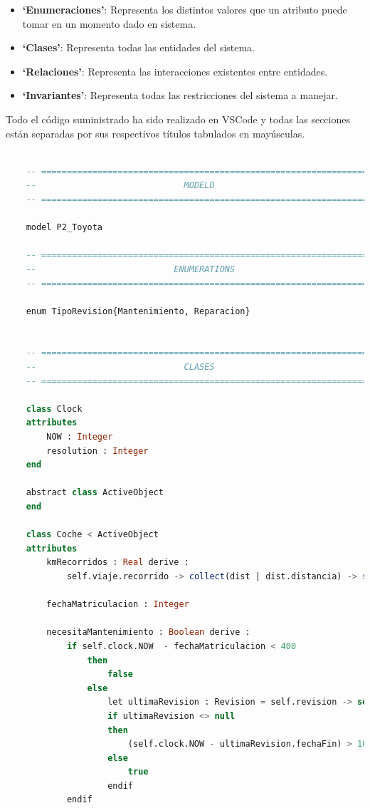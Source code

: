 \documentclass[12pt.a4paper]{article}
\begin{document}
\begin{itemize}
    \item \textbf{‘Enumeraciones’}: Representa los distintos valores que un atributo puede tomar en un momento dado en sistema.
    \item \textbf{‘Clases’}: Representa todas las entidades del sistema.
    \item \textbf{‘Relaciones’}: Representa las interacciones existentes entre entidades.
    \item \textbf{‘Invariantes’}: Representa todas las restricciones del sistema a manejar.
\end{itemize}
Todo el código suministrado ha sido realizado en VSCode y
todas las secciones están separadas por sus respectivos títulos tabulados en mayúsculas.
\vspace{1cm}
\begin{lstlisting}[style = useNormal,language=SQL, caption={Modelo de Sistema de Coches en USE}] 

    -- =====================================================================
    --                             MODELO
    -- =====================================================================
    
    model P2_Toyota
    
    -- =====================================================================
    --                           ENUMERATIONS
    -- =====================================================================
    
    enum TipoRevision{Mantenimiento, Reparacion}
    
    
    -- =====================================================================
    --                             CLASES
    -- =====================================================================
    
    class Clock
    attributes
        NOW : Integer                  
        resolution : Integer 
    end
    
    abstract class ActiveObject
    end
    
    class Coche < ActiveObject
    attributes
        kmRecorridos : Real derive :              
            self.viaje.recorrido -> collect(dist | dist.distancia) -> sum()
            
        fechaMatriculacion : Integer              
    
        necesitaMantenimiento : Boolean derive :  
            if self.clock.NOW  - fechaMatriculacion < 400 
                then
                    false
                else
                    let ultimaRevision : Revision = self.revision -> select(rev | rev.tipo = TipoRevision::Mantenimiento) -> sortedBy(r | r.fechaInicio) -> last() in
                    if ultimaRevision <> null
                    then
                        (self.clock.NOW - ultimaRevision.fechaFin) > 100
                    else
                        true
                    endif
            endif
            

\end{lstlisting}
\end{document}
